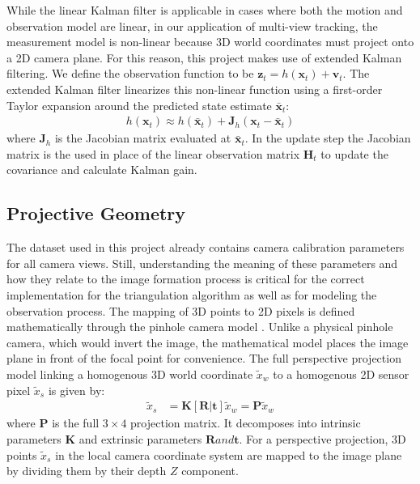 While the linear Kalman filter is applicable in cases where both the motion and observation model are linear, in our application of multi-view tracking, the measurement model is non-linear because 3D world coordinates must project onto a 2D camera plane. For this reason, this project makes use of extended Kalman filtering. We define the observation function to be $\mathbf{z}_t = h(\mathbf{x}_t) + \mathbf{v}_t$. The extended Kalman filter linearizes this non-linear function using a first-order Taylor expansion around the predicted state estimate $\mathbf{\bar{x}}_t$:
\begin{align*}
h(\mathbf{x}_t) \approx h(\mathbf{\bar{x}}_t) + \mathbf{J}_h (\mathbf{x}_t - \mathbf{\bar{x}}_t)
\end{align*}
where $\mathbf{J}_h$ is the Jacobian matrix evaluated at $\mathbf{\bar{x}}_t$. In the update step the Jacobian matrix is the used in place of the linear observation matrix $\mathbf{H}_t$ to update the covariance and calculate Kalman gain.


\subsection{Projective Geometry} \label{calibration}

The dataset used in this project already contains camera calibration parameters for all camera views. Still, understanding the meaning of these parameters and how they relate to the image formation process is critical for the correct implementation for the triangulation algorithm as well as for modeling the observation process. The mapping of 3D points to 2D pixels is defined mathematically through the pinhole camera model \parencite[p. 6-8]{Lanz2026Notes} \parencite{hartley2003multiple}. Unlike a physical pinhole camera, which would invert the image, the mathematical model places the image plane in front of the focal point for convenience. The full perspective projection model linking a homogenous 3D world coordinate $\tilde{x}_w$ to a homogenous 2D sensor pixel $\tilde{x}_s$ is given by:
\begin{align*}
  \tilde{x}_s &= \mathbf{K} [\mathbf{R} | \mathbf{t}] \tilde{x}_w = \mathbf{P} \tilde{x}_w
\end{align*}
where $\mathbf{P}$ is the full $3 \times 4$ projection matrix. It decomposes into intrinsic parameters $\mathbf{K}$ and extrinsic parameters $\mathbf{R} and \mathbf{t}$. For a perspective projection, 3D points $\tilde{x}_s$ in the local camera coordinate system are mapped to the image plane by dividing them by their depth $Z$ component.

